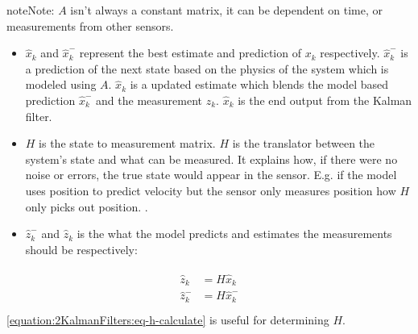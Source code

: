 \documentclass[letterpaper,10pt,english]{jupyterBook}
\begin{document}
\begin{sphinxadmonition}{note}{Note:}
\sphinxAtStartPar
\(A\) isn’t always a constant matrix, it can be dependent on time, or measurements from other sensors.
\end{sphinxadmonition}
\begin{itemize}
\item {} 
\sphinxAtStartPar
\(\hat{x}_k\) and \(\hat{x}^-_k\) represent the best estimate and prediction of \(x_k\) respectively. \(\hat{x}^-_k\) is a prediction of the next state based on the physics of the system which is modeled using \(A\). \(\hat{x}_k\) is a updated estimate which blends the model based prediction \(\hat{x}^-_k\) and the measurement \(z_k\). \(\hat{x}_k\) is the end output from the Kalman filter.

\item {} 
\sphinxAtStartPar
\(H\) is the state to measurement matrix. \(H\) is the translator between the system’s state and what can be measured. It explains how, if there were no noise or errors, the true state would appear in the sensor. E.g. if the model uses position to predict velocity but the sensor only measures position how \(H\) only picks out position. .

\item {} 
\sphinxAtStartPar
\(\hat{z}^-_k\) and \(\hat{z}_k\) is the what the model predicts and estimates the measurements should be respectively:

\end{itemize}
\begin{align}\label{equation:2KalmanFilters:eq-h-calculate}\!\begin{aligned}
\hat{z}_k &= H\hat{x}_k\\
\hat{z}^-_k &= H\hat{x}^-_k\\
\end{aligned}\end{align}
\sphinxAtStartPar
\eqref{equation:2KalmanFilters:eq-h-calculate} is useful for determining \(H\).
\end{document}
